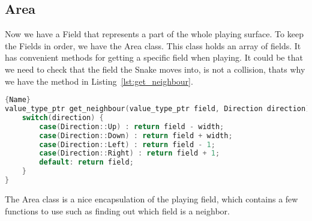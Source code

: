 \subsection{Area}

Now we have a Field that represents a part of the whole playing surface. To keep the Fields in order, we have the Area class. This class holds an array of fields. It has convenient methods for getting a specific field when playing. It could be that we need to check that the field the Snake moves into, is not a collision, thats why we have the method in Listing~\ref{lst:get_neighbour}.


\begin{lstlisting}[caption={Getting a neighbour field},label={lst:get_neighbour},frame=tlrb, language=C++]{Name}
value_type_ptr get_neighbour(value_type_ptr field, Direction direction) {
	switch(direction) {
		case(Direction::Up) : return field - width;
		case(Direction::Down) : return field + width;
		case(Direction::Left) : return field - 1;
		case(Direction::Right) : return field + 1;
		default: return field;
	}
}
\end{lstlisting}

The Area class is a nice encapsulation of the playing field, which contains a few functions to use such as finding out which field is a neighbor.